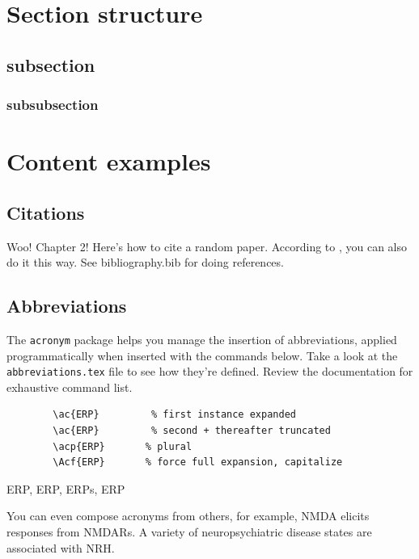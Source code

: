 \documentclass[../../main.tex]{subfiles}  %
\begin{document}
\section{Section structure}

	\subsection{subsection}

	\subsubsection{subsubsection}

\section{Content examples}

	\subsection{Citations}

	Woo! 
	Chapter 2!
	Here's how to cite a random paper\supercite{aartsSolutionDependencyUsing2014}. 
	According to \citeauthor{aartsSolutionDependencyUsing2014} \citeyear{aartsSolutionDependencyUsing2014}, you can also do it this way.
	See bibliography.bib for doing references.

	\subsection{Abbreviations}

	The \verb|acronym| package helps you manage the insertion of abbreviations, applied programmatically when inserted with the commands below. 
	Take a look at the \verb|abbreviations.tex| file to see how they're defined.
	Review the documentation for exhaustive command list.

	\begin{verbatim}
		\ac{ERP}		 % first instance expanded
		\ac{ERP}		 % second + thereafter truncated
		\acp{ERP}		% plural
		\Acf{ERP}		% force full expansion, capitalize
	  \end{verbatim}

	\ac{ERP}, \ac{ERP}, \acp{ERP}, \Acf{ERP}	

	You can even compose acronyms from others, for example, \ac{NMDA} elicits responses from \acp{NMDAR}. 
	A variety of neuropsychiatric disease states are associated with \ac{NRH}.
\end{document}
